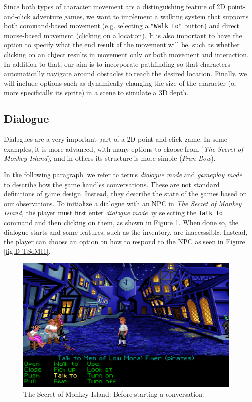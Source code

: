 Since both types of character movement are a distinguishing feature of 2D point-and-click adventure games, we want to implement a walking system that supports both command-based movement (e.g. selecting a \texttt{"Walk to"} button) and direct mouse-based movement (clicking on a location). It is also important to have the option to specify what the end result of the movement will be, such as whether clicking on an object results in movement only or both movement and interaction. In addition to that, our aim is to incorporate pathfinding so that characters automatically navigate around obstacles to reach the desired location. Finally, we will include options such as dynamically changing the size of the character (or more specifically its sprite) in a scene to simulate a 3D depth.

    
\subsection{Dialogue}
\label{sec:Dialogue}
Dialogues are a very important part of a 2D point-and-click game. In some examples, it is more advanced, with many options to choose from (\textit{The Secret of Monkey Island}), and in others its structure is more simple (\textit{Fran Bow}).  

In the following paragraph, we refer to terms \textit{dialogue mode} and \textit{gameplay mode} to describe how the game handles conversations. These are not standard definitions of game design. Instead, they describe the state of the games based on our observations. To initialize a dialogue with an NPC in \textit{The Secret of Monkey Island}, the player must first enter \textit{dialogue mode} by selecting the \texttt{Talk to} command and then clicking on them, as shown in Figure \ref{fig:D-TSoMI0}. When done so, the dialogue starts and some features, such as the inventory, are inaccessible. Instead, the player can choose an option on how to respond to the NPC as seen in Figure \ref{fig:D-TSoMI1}. 

\begin{figure}[H]
\centering
\includegraphics[width=.8\linewidth]{img/D-TSoMI0.png}
\caption{The Secret of Monkey Island: Before starting a conversation.}
\label{fig:D-TSoMI0}
\end{figure}

